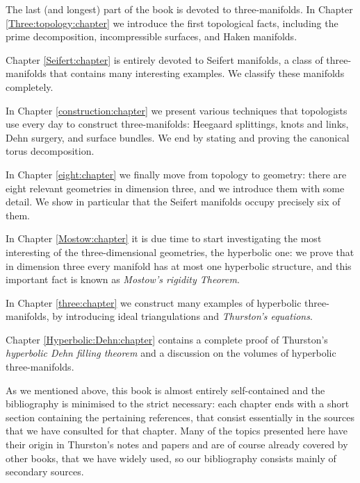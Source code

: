 \documentclass [11pt]{amsbook}
\theoremstyle{definition}
\theoremstyle{remark}
\numberwithin{section}{chapter}  %
\numberwithin{subsection}{section}  %
\numberwithin{figure}{chapter}
\numberwithin{table}{chapter}
\begin{document}
The last (and longest) part of the book is devoted to three-manifolds.  In Chapter \ref{Three:topology:chapter} we introduce the first topological facts, including the prime decomposition, incompressible surfaces, and Haken manifolds.

Chapter \ref{Seifert:chapter} is entirely devoted to Seifert manifolds, a class of three-manifolds that contains many interesting examples. We classify these manifolds completely.

In Chapter \ref{construction:chapter} we present various techniques that topologists use every day to construct three-manifolds: Heegaard splittings, knots and links, Dehn surgery, and surface bundles. We end by stating and proving the canonical torus decomposition.

In Chapter \ref{eight:chapter} we finally move from topology to geometry: there are eight relevant geometries in dimension three, and we introduce them with some detail. We show in particular that the Seifert manifolds occupy precisely six of them.

In Chapter \ref{Mostow:chapter} it is due time to start investigating the most interesting of the three-dimensional geometries, the hyperbolic one: we prove that in dimension three every manifold has at most one hyperbolic structure, and this important fact is known as \emph{Mostow's rigidity Theorem}.

In Chapter \ref{three:chapter} we construct many examples of hyperbolic three-manifolds, by introducing ideal triangulations and \emph{Thurston's equations}.

Chapter \ref{Hyperbolic:Dehn:chapter} contains a complete proof of Thurston's \emph{hyperbolic Dehn filling theorem} and a discussion on the volumes of hyperbolic three-manifolds.

As we mentioned above, this book is almost entirely self-contained and the bibliography is minimised to the strict necessary: each chapter ends with a short section containing the pertaining references, that consist essentially in the sources that we have consulted for that chapter. Many of the topics presented here have their origin in Thurston's notes and papers and are of course already covered by other books, that we have widely used, so our bibliography consists mainly of secondary sources.
\end{document}

